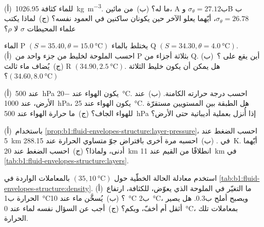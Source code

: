 \begin{exercise}[$\star$]\label{exo:b1:fluid-envelopes-structure:3}
(أ)~للماء كثافة \qty{1026.95}{kg.m^{-3}}. ما  له؟ (ب)~من مائين، A ب$\sigma_\theta = 27.12$ وB ب$\sigma_\theta = 26.78$، أيّهما يعلو الآخر حين يكونان ساكنين في العمود نفسه؟ (ج)~لماذا يكتب علماء المحيطات $\sigma$ لا $\rho$؟
\end{exercise}

\begin{exercise}[$\star$]\label{exo:b1:fluid-envelopes-structure:4}
الماء P $(S = 35.40, \theta = \qty{15.0}{\celsius})$ يختلط بالماء Q $(S =
34.30, \theta = \qty{4.0}{\celsius})$. (أ)~احسب الملوحة  لخليط من جزء واحد من P بثلاثة أجزاء من Q. (ب)~أين يقع على ؟ (ج)~يُضاف ماء ثالث R $(34.90,
\qty{2.5}{\celsius})$. هل يمكن أن يكون خليط الثلاثة $(34.60, \qty{8.0}{\celsius})$؟
\end{exercise}

\begin{exercise}[$\star\star$]\label{exo:b1:fluid-envelopes-structure:5}
(أ)~عند \qty{500}{hPa} يكون الهواء عند \qty{-20}{\celsius}. احسب درجة حرارته الكامنة. (ب)~عند الأرض، عند \qty{1000}{hPa}، يكون الهواء عند \qty{25}{\celsius}. هل الطبقة بين المستويين مستقرّة للهواء الجاف؟ (ج)~ما حرارة الهواء عند \qty{500}{hPa} إذا أُنزل بعملية أديباتية حتى الأرض؟
\end{exercise}

\begin{exercise}[$\star\star$]\label{exo:b1:fluid-envelopes-structure:6}
(أ)~باستخدام \cref{prop:b1:fluid-envelopes-structure:layer-pressure}، احسب الضغط عند \qty{5}{km} في . (ب)~احسبه مرة أخرى بافتراض جوّ متساوي الحرارة عند \qty{288.15}{K}. أيّهما أدنى، ولماذا؟ (ج)~احسب الضغط عند \qty{20}{km} انطلاقًا من القيم عند \qty{11}{km} في \cref{tab:b1:fluid-envelopes-structure:layers}.
\end{exercise}

\begin{exercise}[$\star\star$]\label{exo:b1:fluid-envelopes-structure:7}
استخدم معادلة الحالة الخطّية حول $(35, \qty{10}{\celsius})$ بالمعاملات الواردة في \cref{tab:b1:fluid-envelopes-structure:density}. (أ)~ما التغيّر في الملوحة الذي يعوّض، للكثافة، ارتفاع الحرارة ب\qty{1}{\celsius}؟ (ب)~يُسخَّن ماء عند \qty{10}{\celsius} ب\qty{2}{\celsius}، ويصبح أملح ب\num{0.3}. هل يصير أثقل أم أخفّ، وبكم؟ (ج)~أجب عن السؤال نفسه لماء عند \qty{0}{\celsius}، بمعاملات تلك الحرارة.
\end{exercise}

